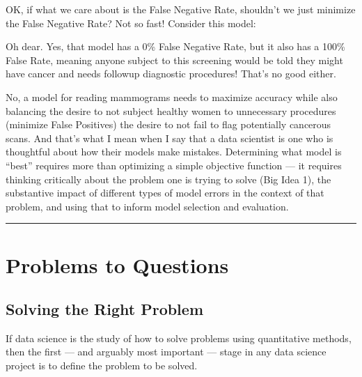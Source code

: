 \documentclass[letterpaper,10pt,english]{jupyterBook}
\begin{document}
\sphinxAtStartPar
OK, if what we care about is the False Negative Rate, shouldn’t we just minimize the False Negative Rate? Not so fast! Consider this model:

\begin{sphinxVerbatim}[commandchars=\\\{\}]
 
      
     
\end{sphinxVerbatim}

\sphinxAtStartPar
Oh dear. Yes, that model has a 0\% False Negative Rate, but it also has a 100\% False  Rate, meaning anyone subject to this screening would be told they might have cancer and needs followup diagnostic procedures! That’s no good either.

\sphinxAtStartPar
No, a  model for reading mammograms needs to maximize accuracy while also balancing the desire to not subject healthy women to unnecessary procedures (minimize False Positives)  the desire to not fail to flag potentially cancerous scans. And that’s what I mean when I say that a  data scientist is one who is thoughtful about how their models make mistakes. Determining what model is “best” requires more than optimizing a simple objective function — it requires thinking critically about the problem one is trying to solve (Big Idea 1), the substantive impact of different types of model errors in the context of that problem, and using that to inform model selection and evaluation.




\bigskip\hrule\bigskip


\sphinxstepscope


\part{Problems to Questions}

\sphinxstepscope


\chapter{Solving the Right Problem}
\label{\detokenize{20_problems_to_questions/10_solving_the_right_problem:solving-the-right-problem}}\label{\detokenize{20_problems_to_questions/10_solving_the_right_problem::doc}}
\sphinxAtStartPar
If data science is the study of how to solve problems using quantitative methods, then the first — and arguably most important — stage in any data science project is to define the problem to be solved.
\end{document}
